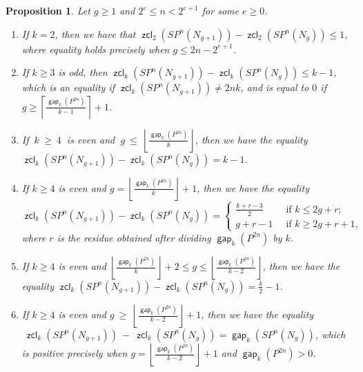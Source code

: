 \documentclass[amscd,amssymb,verbatim,10pt]{amsart}
\numberwithin{equation}{section}
\theoremstyle{plain}
\newtheorem{proposition}[thm]{Proposition}
\theoremstyle{definition}
\DeclareMathOperator{\zcl}{{\mathsf{zcl}}}
\DeclareMathOperator{\gap}{{\mathsf{gap}}}
\begin{document}
\begin{proposition}\label{prop: zcl difference}
    Let $g\ge 1$ and $2^e\le n<2^{e+1}$ for some $e\ge 0$.
    \begin{enumerate}
        \item If $k=2$, then we have that $\zcl_2(SP^n(N_{g+1}))- \zcl_2(SP^n(N_g))\le 1$, where equality holds precisely when $g\le 2n-2^{e+1}$.\label{diff one}
        \item If $k\ge 3$ is odd, then $\zcl_k(SP^n(N_{g+1}))- \zcl_k(SP^n(N_g))\le k-1$, which is an equality if $\zcl_k(SP^n(N_{g+1}))\ne 2nk$, and is equal to $0$ if $g\ge\left\lceil\tfrac{\gap_k(P^{2n})}{k-1}\right\rceil+1$.\label{diff two}
        \item If $\ k\ \ge\ 4 \ $ is even and $\ g\ \le\ \left\lfloor\tfrac{\gap_k(P^{2n})}{k}\right\rfloor$, then we have the equality $\zcl_k(SP^n(N_{g+1}))- \zcl_k(SP^n(N_g))=k-1$.\label{diff three}
        \item If $k \ge 4$ is even and $g= \left\lfloor\tfrac{\gap_k(P^{2n})}{k}\right\rfloor+1$, then we have the equality
        \[
       \zcl_k(SP^n(N_{g+1}))- \zcl_k(SP^n(N_g))=\begin{cases}
           \frac{k+r-3}{2} & \ \text{ if } k\le 2g+r;
           \\
           g+r-1 & \ \text{ if } k\ge 2g+r+1,
       \end{cases} 
        \]
    where $r$ is the residue obtained after dividing $\gap_k(P^{2n})$ by $k$.
       \item If $k\ge 4$ is even and $\left\lfloor\tfrac{\gap_k(P^{2n})}{k}\right\rfloor+2\le g \le \left\lfloor\tfrac{\gap_k(P^{2n})}{k-2}\right\rfloor$, then we have the equality $\zcl_k(SP^n(N_{g+1}))-\zcl_k(SP^n(N_g))=\tfrac{k}{2}-1$.\label{diff five}
        \item If $k \ge 4$ is even and $g \ \ge \ \left\lfloor\tfrac{\gap_k(P^{2n})}{k-2}\right\rfloor+1$, then we have the equality $\ \zcl_k(SP^n(N_{g+1}))\ - \ \zcl_k(SP^n(N_g))=\gap_k(SP^n(N_{g}))$, which is positive precisely when $g =\left\lfloor\tfrac{\gap_k(P^{2n})}{k-2}\right\rfloor+1$ and $\gap_k(P^{2n})>0$.\label{diff six}
        \end{enumerate}
\end{proposition}
\end{document}
